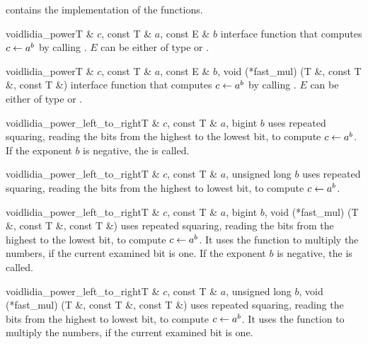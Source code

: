  contains the implementation of the functions.

\begin{fcode}{void}{lidia_power}{T & $c$, const T & $a$, const E & $b$}
  interface function that computes $c \leftarrow a^b$ by calling .
  $E$ can be either of type  or .
\end{fcode}

\begin{fcode}{void}{lidia_power}{T & $c$, const T & $a$, const E & $b$,
    void (*fast_mul) (T &, const T &, const T &)}%
  interface function that computes $c \leftarrow a^b$ by calling .
  $E$ can be either of type  or .
\end{fcode}

\begin{fcode}{void}{lidia_power_left_to_right}{T & $c$, const T & $a$, bigint $b$}
  uses repeated squaring, reading the bits from the highest to the lowest bit, to compute $c
  \leftarrow a^b$.  If the exponent $b$ is negative, the \LEH is called.
\end{fcode}

\begin{fcode}{void}{lidia_power_left_to_right}{T & $c$, const T & $a$, unsigned long $b$}
  uses repeated squaring, reading the bits from the highest to lowest bit, to compute $c \leftarrow
  a^b$.
\end{fcode}

\begin{fcode}{void}{lidia_power_left_to_right}{T & $c$, const T & $a$, bigint $b$,
    void (*fast_mul) (T &, const T &, const T &)}%
  uses repeated squaring, reading the bits from the highest to the lowest bit, to compute $c
  \leftarrow a^b$.  It uses the function  to multiply the numbers, if the current
  examined bit is one.  If the exponent $b$ is negative, the \LEH is called.
\end{fcode}

\begin{fcode}{void}{lidia_power_left_to_right}{T & $c$, const T & $a$, unsigned long $b$,
    void (*fast_mul) (T &, const T &, const T &)}%
  uses repeated squaring, reading the bits from the highest to lowest bit, to compute $c \leftarrow
  a^b$.  It uses the function  to multiply the numbers, if the current examined bit is
  one.
\end{fcode}

